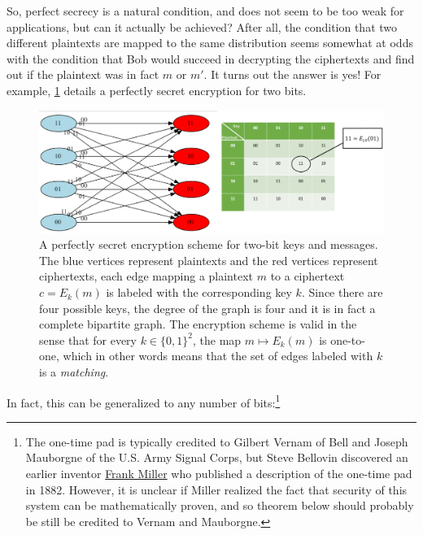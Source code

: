 So, perfect secrecy is a natural condition, and does not seem to be too
weak for applications, but can it actually be achieved? After all, the
condition that two different plaintexts are mapped to the same
distribution seems somewhat at odds with the condition that Bob would
succeed in decrypting the ciphertexts and find out if the plaintext was
in fact \(m\) or \(m'\). It turns out the answer is yes! For example,
\cref{onetimepadtwofig} details a perfectly secret encryption for two
bits.

\begin{figure}
\centering
\includegraphics[width=\textwidth, height=0.25\paperheight, keepaspectratio]{../figure/onetimepadtwobits.png}
\caption{A perfectly secret encryption scheme for two-bit keys and
messages. The blue vertices represent plaintexts and the red vertices
represent ciphertexts, each edge mapping a plaintext \(m\) to a
ciphertext \(c=E_k(m)\) is labeled with the corresponding key \(k\).
Since there are four possible keys, the degree of the graph is four and
it is in fact a complete bipartite graph. The encryption scheme is valid
in the sense that for every \(k\in \{0,1\}^2\), the map
\(m \mapsto E_k(m)\) is one-to-one, which in other words means that the
set of edges labeled with \(k\) is a \emph{matching}.}
\label{onetimepadtwofig}
\end{figure}

In fact, this can be generalized to any number of bits:\footnote{The
  one-time pad is typically credited to Gilbert Vernam of Bell and
  Joseph Mauborgne of the U.S. Army Signal Corps, but Steve Bellovin
  discovered an earlier inventor
  \href{http://www.cs.columbia.edu/~CS4HS/talks/FrankMillerOneTimePad.pdf}{Frank
  Miller} who published a description of the one-time pad in 1882.
  However, it is unclear if Miller realized the fact that security of
  this system can be mathematically proven, and so theorem below should
  probably be still be credited to Vernam and Mauborgne.}

\hypertarget{onetimepad}{}

